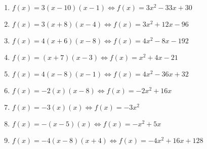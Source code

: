 \documentclass{article}%
\begin{document}
\begin{enumerate}[label=\alph*)]
\item%
\newline\vspace{0.5cm}$f(x)=3(x-10)(x-1)\Leftrightarrow f(x)=3x^2 - 33x + 30$%
\item%
\newline\vspace{0.5cm}$f(x)=3(x+8)(x-4)\Leftrightarrow f(x)=3x^2 + 12x - 96$%
\item%
\newline\vspace{0.5cm}$f(x)=4(x+6)(x-8)\Leftrightarrow f(x)=4x^2 - 8x - 192$%
\item%
\newline\vspace{0.5cm}$f(x)=(x+7)(x-3)\Leftrightarrow f(x)=x^2 + 4x - 21$%
\item%
\newline\vspace{0.5cm}$f(x)=4(x-8)(x-1)\Leftrightarrow f(x)=4x^2 - 36x + 32$%
\item%
\newline\vspace{0.5cm}$f(x)=-2(x)(x-8)\Leftrightarrow f(x)=-2x^2 + 16x$%
\item%
\newline\vspace{0.5cm}$f(x)=-3(x)(x)\Leftrightarrow f(x)=-3x^2$%
\item%
\newline\vspace{0.5cm}$f(x)=-(x-5)(x)\Leftrightarrow f(x)=-x^2 + 5x$%
\item%
\newline\vspace{0.5cm}$f(x)=-4(x-8)(x+4)\Leftrightarrow f(x)=-4x^2 + 16x + 128$%
\end{enumerate}

%
\end{document}
